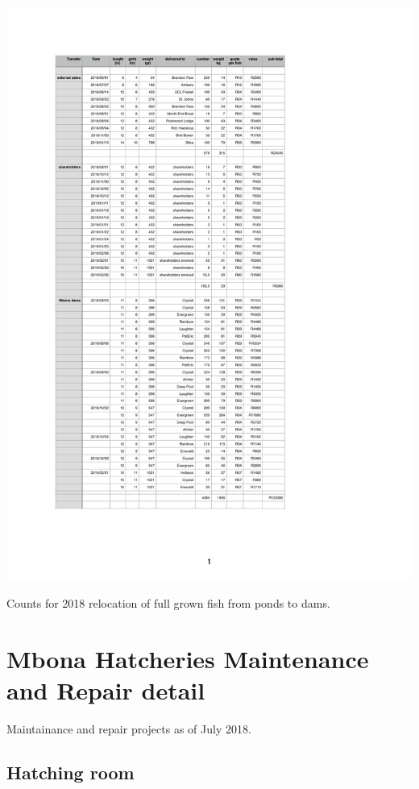 \begin{table}[H]
  \centering
  \includegraphics[scale = 0.9]{tables/TablesFishRelocationRecord.pdf}
   \caption{Counts for 2018 relocation of full grown fish from ponds to dams.}
  \label{tab:FishRelocation2018}
\end{table}




\section{Mbona Hatcheries Maintenance and Repair detail}

Maintainance and repair projects as of July 2018.

\subsection{Hatching room}     

